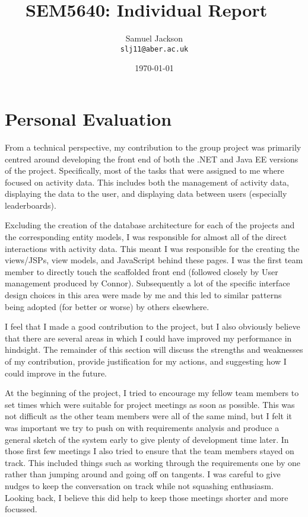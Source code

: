\documentclass[paper=a4, fontsize=11pt]{scrartcl}	%
\title{
	\vspace{-0.5in} 	\usefont{OT1}{bch}{b}{n}
	 SEM5640: Individual Report \
}
\author{
	\usefont{OT1}{bch}{m}{n} Samuel Jackson
	\\   \texttt{slj11@aber.ac.uk}
}
\date{\today}
\numberwithin{equation}{section}															%
\numberwithin{figure}{section}																%
\numberwithin{table}{section}
\begin{document}
\maketitle
\section*{Personal Evaluation}
From a technical perspective, my contribution to the group project was primarily centred around developing the front end of both the .NET and Java EE versions of the project. Specifically, most of the tasks that were assigned to me where focused on activity data. This includes both the management of activity data, displaying the data to the user, and displaying data between users (especially leaderboards).

Excluding the creation of the database architecture for each of the projects and the corresponding entity models, I was responsible for almost all of the direct interactions with activity data. This meant I was responsible for the creating the views/JSPs, view models, and JavaScript behind these pages. I was the first team member to directly touch the scaffolded front end (followed closely by User management produced by Connor). Subsequently a lot of the specific interface design choices in this area were made by me and this led to similar patterns being adopted (for better or worse) by others elsewhere.

I feel that I made a good contribution to the project, but I also obviously believe that there are several areas in which I could have improved my performance in hindsight. The remainder of this section will discuss the strengths and weaknesses of my contribution, provide justification for my actions, and suggesting how I could improve in the future.

At the beginning of the project, I tried to encourage my fellow team members to set times which were suitable for project meetings as soon as possible. This was not difficult as the other team members were all of the same mind, but I felt it was important we try to push on with requirements analysis and produce a general sketch of the system early to give plenty of development time later. In those first few meetings I also tried to ensure that the team members stayed on track. This included things such as working through the requirements one by one rather than jumping around and going off on tangents. I was careful to give nudges to keep the conversation on track while not squashing enthusiasm. Looking back, I believe this did help to keep those meetings shorter and more focussed.
\end{document}
